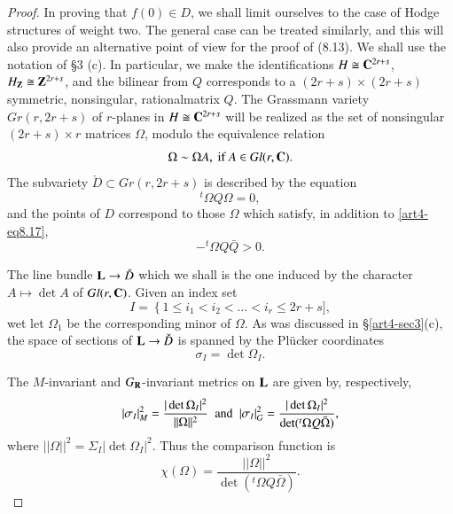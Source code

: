 \begin{proof}
In proving that $f(0) \in D$, we shall limit ourselves to the case of Hodge structures of weight two. The general case can be treated similarly, and this will also provide an alternative point of view for the proof of (8.13). We shall use the notation of \S 3 (c). In particular, we make the identifications $H \cong \mathbf{C}^{2r+s}$, $H_{\mathbf{Z}} \cong \mathbf{Z}^{2r+s}$, and the bilinear from $Q$ corresponds to a $(2r+s) \times (2r+s)$ symmetric, nonsingular, rational\pageoriginale matrix $Q$. The Grassmann variety $Gr (r, 2 r + s)$ of $r$-planes in $H \cong \mathbf{C}^{2r+s}$  will be realized as the set of nonsingular $(2r+s) \times r$ matrices $\Omega$, modulo the equivalence relation
\begin{equation}
\Omega \sim \Omega A, \text{ if } A \in G l (r, \mathbf{C}). 
\label{art4-eq8.16}
\end{equation}
The subvariety $\check{D} \subset Gr (r, 2r + s)$ is described by the equation
\begin{equation}
{}^t \Omega Q \Omega = 0, \label{art4-eq8.17}
\end{equation}
and the points of $D$ correspond to those $\Omega$ which satisfy, in addition to \eqref{art4-eq8.17},
\begin{equation}
-^t \Omega Q \bar{Q} >0. \label{art4-eq8.18}
\end{equation}

The line bundle $\mathbf{L} \to \check{D}$ which we shall is the one induced by the character $A \longmapsto \det A$ of $Gl(r,\mathbf{C})$. Given an index set 
$$
I = \left\{1 \leqslant i_1 < i_2 < \ldots < i_r \leqslant 2r + s \right. ],
$$
wet let $\Omega_1$ be the corresponding minor of $\Omega$. As was discussed in \S \ref{art4-sec3}(c), the space of sections of $\mathbf{L} \to \check{D}$ is spanned by the Pl\"{u}cker coordinates
$$
\sigma_I = \det \Omega_I.
$$

The $M$-invariant and $G_{\mathbf{R}}$-invariant metrics on $\mathbf{L}$ are given by, respectively,
$$
|\sigma_I|^2_M = \frac{|\det \Omega_I|^2}{||\Omega||^2} \text{\; and \;} |\sigma_I|^2_G = \frac{|\det \Omega_I|^2}{\det ({}^t \Omega Q \bar{\Omega})},
$$
where $||\Omega||^2 = \Sigma_I |\det \Omega_I|^2$. Thus the comparison function is 
\begin{equation}
\chi(\Omega) = \frac{||\Omega||^2}{\det ({}^t \Omega Q \bar{\Omega})}.
\label{art4-eq8.19}
\end{equation}


\end{proof}
